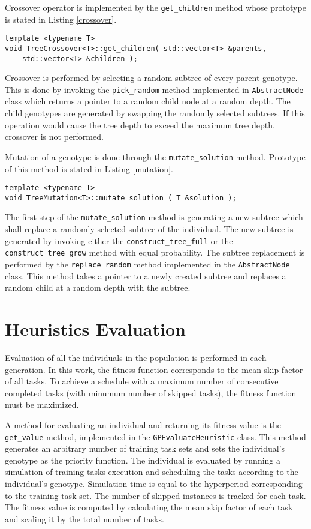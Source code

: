 Crossover operator is implemented by the \texttt{get\_children} method whose prototype is stated in Listing \ref{crossover}.
\begin{lstlisting}[frame=none, label={crossover}, caption={Prototype of the \texttt{get\_children} method which performs crossover.}, captionpos=b]
template <typename T>
void TreeCrossover<T>::get_children( std::vector<T> &parents, 
	std::vector<T> &children );
\end{lstlisting}
Crossover is performed by selecting a random subtree of every parent genotype.
This is done by invoking the \texttt{pick\_random} method implemented in \texttt{AbstractNode} class which returns a pointer to a random child node at a random depth.
The child genotypes are generated by swapping the randomly selected subtrees.
If this operation would cause the tree depth to exceed the maximum tree depth, crossover is not performed.

Mutation of a genotype is done through the \texttt{mutate\_solution} method.
Prototype of this method is stated in Listing \ref{mutation}.
\begin{lstlisting}[frame=none, label={mutation}, caption={Prototype of the \texttt{mutate\_solution} method.}, captionpos=b]
template <typename T>
void TreeMutation<T>::mutate_solution ( T &solution );
\end{lstlisting}
The first step of the \texttt{mutate\_solution} method is generating a new subtree which shall replace a randomly selected subtree of the individual.
The new subtree is generated by invoking either the \texttt{construct\_tree\_full} or the \texttt{construct\_tree\_grow} method with equal probability.
The subtree replacement is performed by the \texttt{replace\_random} method implemented in the \texttt{AbstractNode} class.
This method takes a pointer to a newly created subtree and replaces a random child at a random depth with the subtree.

\section{Heuristics Evaluation}
\label{evaluation}
Evaluation of all the individuals in the population is performed in each generation.
In this work, the fitness function corresponds to the mean skip factor of all tasks.
To achieve a schedule with a maximum number of consecutive completed tasks (with minumum number of skipped tasks), the fitness function must be maximized.

A method for evaluating an individual and returning its fitness value is the \texttt{get\_value} method, implemented in the \texttt{GPEvaluateHeuristic} class.
This method generates an arbitrary number of training task sets and sets the individual's genotype as the priority function.
The individual is evaluated by running a simulation of training tasks execution and scheduling the tasks according to the individual's genotype.
Simulation time is equal to the hyperperiod corresponding to the training task set.
The number of skipped instances is tracked for each task.
The fitness value is computed by calculating the mean skip factor of each task and scaling it by the total number of tasks.

